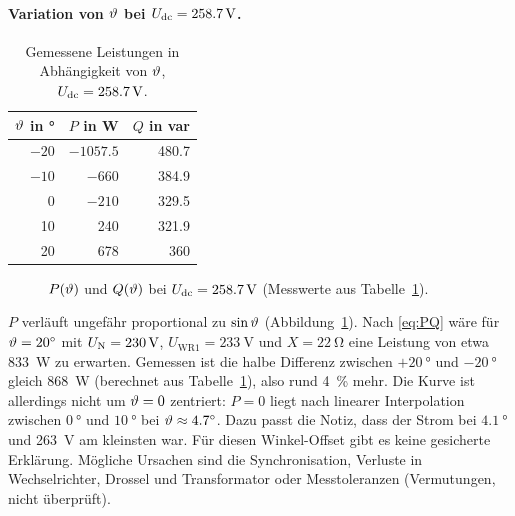 

\paragraph{\texorpdfstring{Variation von $\vartheta$ bei $U_{\mathrm{dc}}=\SI{258.7}{\volt}$}{Variation von Theta bei Udc = 258.7 V}.}

\begin{table}[htbp]
  \centering
  \caption{Gemessene Leistungen in Abhängigkeit von $\vartheta$, $U_{\mathrm{dc}}=\SI{258.7}{\volt}$.}
  \label{tab:theta}
  \begin{tabular}{@{}rrr@{}}
    \toprule
    $\vartheta$ in \si{\degree} & $P$ in W & $Q$ in var \\
    \midrule
    $-20$ & $-1057.5$ & 480.7 \\
    $-10$ & $-660$ & 384.9 \\
    0 & $-210$ & 329.5 \\
    10 & 240 & 321.9 \\
    20 & 678 & 360 \\
    \bottomrule
  \end{tabular}
\end{table}

\begin{figure}[htbp]
  \centering
  \caption{$P(\vartheta)$ und $Q(\vartheta)$ bei $U_{\mathrm{dc}}=\SI{258.7}{\volt}$ (Messwerte aus Tabelle~\ref{tab:theta}).}
  \label{fig:Ptheta}
\end{figure}

$P$ verläuft ungefähr proportional zu $\sin\vartheta$ (Abbildung~\ref{fig:Ptheta}). Nach \eqref{eq:PQ} wäre für $\vartheta=\SI{20}{\degree}$ mit $U_{\mathrm{N}}=\SI{230}{\volt}$, $U_{\mathrm{WR1}}=\SI{233}{\volt}$ und $X=\SI{22}{\ohm}$ eine Leistung von etwa \SI{833}{\watt} zu erwarten. Gemessen ist die halbe Differenz zwischen $+\SI{20}{\degree}$ und $-\SI{20}{\degree}$ gleich \SI{868}{\watt} (berechnet aus Tabelle~\ref{tab:theta}), also rund \SI{4}{\percent} mehr. Die Kurve ist allerdings nicht um $\vartheta=0$ zentriert: $P=0$ liegt nach linearer Interpolation zwischen $\SI{0}{\degree}$ und $\SI{10}{\degree}$ bei $\vartheta\approx\SI{4.7}{\degree}$. Dazu passt die Notiz, dass der Strom bei $\SI{4.1}{\degree}$ und \SI{263}{\volt} am kleinsten war. Für diesen Winkel-Offset gibt es keine gesicherte Erklärung. Mögliche Ursachen sind die Synchronisation, Verluste in Wechselrichter, Drossel und Transformator oder Messtoleranzen (Vermutungen, nicht überprüft).

